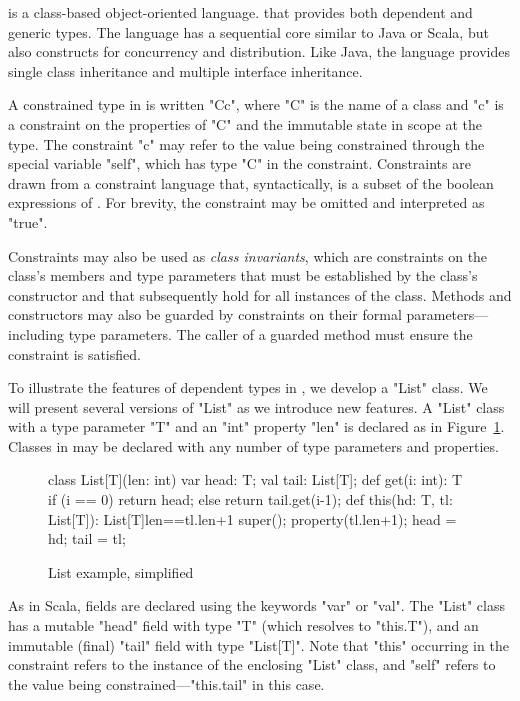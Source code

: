 \Xten{} is a class-based object-oriented language.
that provides both dependent and generic types.
The language has a sequential core similar to Java or Scala, but
also
constructs for concurrency and distribution.
Like Java, the language provides single class
inheritance and multiple interface inheritance.

A constrained type in \Xten{} is written \xcd"C{c}", where \xcd"C" is the
name of a class and \xcd"c" is a constraint on the properties
of \xcd"C" and the immutable state in scope at the type.  The
constraint \xcd"c" may refer to the value being constrained through
the special variable \xcd"self", which has type \xcd"C" in the
constraint.  Constraints are drawn from a constraint language that,
syntactically, is a subset of the boolean expressions of \Xten{}.  For
brevity, the constraint may be omitted and interpreted as \xcd"true".

Constraints may also be used as \emph{class invariants}, 
which are constraints on the class's members and type parameters 
that must be established by the class's
constructor and that subsequently hold for all instances of the class.
Methods and constructors may also be guarded by constraints on
their formal parameters---including type parameters. The
caller of a guarded method must ensure the constraint is
satisfied.

To illustrate the features of dependent types in \Xten{}, we
develop a \xcd"List"
class.  We will present several versions of \xcd"List" as we
introduce new features.
A \xcd"List" class with a type parameter \xcd"T" and an \xcd"int"
property \xcd"len" is declared as in Figure~\ref{fig:list0}.
Classes in \Xten{} may be declared with any number of type
parameters and properties.

\begin{figure}
{
\begin{xtennoindent}
      class List[T](len: int) {
        var head: T;
        val tail: List[T];
        def get(i: int): T {
          if (i == 0) return head;
          else return tail.get(i-1);
        }
        def this(hd: T, tl: List[T]):
            List[T]{len==tl.len+1} {
          super();
          property(tl.len+1);
          head = hd; tail = tl;
        }
      }
\end{xtennoindent}
}
\caption{List example, simplified}
\label{fig:list0}
\end{figure}

As in Scala, fields are declared using the keywords \xcd"var"
or \xcd"val".  The \xcd"List" class has a mutable \xcd"head"
field with type \xcd"T" (which resolves to \xcd"this.T"), and an
immutable (final) \xcd"tail" field with type \xcd"List[T]".
Note that \xcd"this" occurring
in the constraint refers to the instance of the enclosing
\xcd"List" class,
and \xcd"self" refers to the value being
constrained---\xcd"this.tail" in this case.

